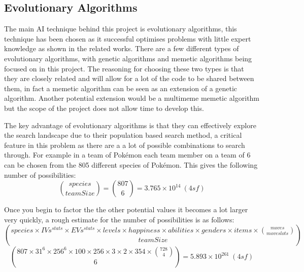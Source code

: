 \documentclass[a4paper]{article}
\newcommand{\Pokemon}{Pok\'{e}mon}
\begin{document}
\subsection{Evolutionary Algorithms}
\par
The main AI technique behind this project is evolutionary algorithms, this technique has been chosen as it successful optimises problems with little expert knowledge as shown in the related works.
There are a few different types of evolutionary algorithms, with genetic algorithms and memetic algorithms being focused on in this project.
The reasoning for choosing these two types is that they are closely related and will allow for a lot of the code to be shared between them, in fact a memetic algorithm can be seen as an extension of a genetic algorithm.
Another potential extension would be a multimeme memetic algorithm but the scope of the project does not allow time to develop this.
\par
The key advantage of evolutionary algorithms is that they can effectively explore the search landscape due to their population based search method, a critical feature in this problem as there are a a lot of possible combinations to search through.
For example in a team of \Pokemon{} each team member on a team of 6 can be chosen from the 805 different species of \Pokemon{}.
This gives the following number of possibilities:
\begin{equation}
{species \choose teamSize} = {807 \choose 6} = 3.765 \times 10^{14}\ (4sf) %
\end{equation}
\par
Once you begin to factor the the other potential values it becomes a lot larger very quickly, a rough estimate for the number of possibilities is as follows:
\begin{equation}
{species \times IVs^{stats} \times EVs^{stats} \times levels \times happiness \times abilities \times genders \times items \times {moves \choose move slots} \choose teamSize}
\end{equation}
\begin{equation}
    {807 \times 31^6 \times 256^6 \times 100 \times 256 \times 3 \times 2 \times 354 \times {728 \choose 4} \choose 6} = 5.893 \times 10^{261}\ (4sf)
\end{equation} %
\end{document}
